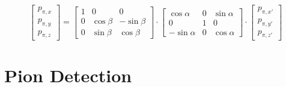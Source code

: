 \documentclass[a4paper,parskip,11pt, DIV12]{scrreprt}
\begin{document}
	\begin{equation}
		\begin{bmatrix}
			p_{\pi,x} \\ p_{\pi,y} \\ p_{\pi,z}
		\end{bmatrix}
		=
		\begin{bmatrix}
			1 &   0         & 0           \\
			0 & \cos \beta & -\sin \beta \\
			0 & \sin \beta &  \cos \beta
		\end{bmatrix}
		\cdot
		\begin{bmatrix}
			\cos \alpha  & 0 & \sin \alpha \\
			0         & 1 &  0          \\
			-\sin \alpha & 0 & \cos \alpha
		\end{bmatrix}
		\cdot
		\begin{bmatrix}
			p_{\pi,x'} \\ p_{\pi,y'} \\ p_{\pi,z'}
		\end{bmatrix}
	\end{equation}
	
	\clearpage
	
	
	\section{Pion Detection} \label{sec:pdetection}
	
\end{document}
